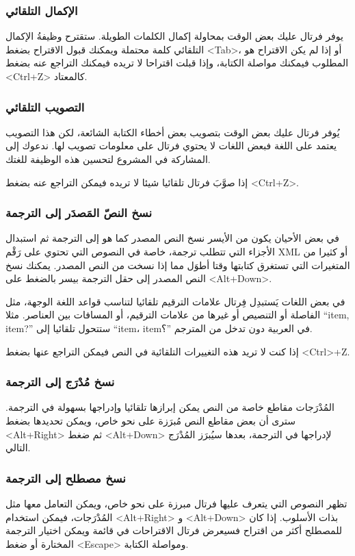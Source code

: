 \subsubsection{الإكمال التلقائي}
يوفر فرتال عليك بعض الوقت بمحاولة إكمال الكلمات الطويلة. ستقترح وظيفةُ
الإكمال التلقائي كلمة محتملة ويمكنك قبول الاقتراح بضغط <Tab>، أو إذا لم
يكن الاقتراح هو المطلوب فيمكنك مواصلة الكتابة، وإذا قبلت اقتراحا لا
تريده فيمكنك التراجع عنه بضغط <Ctrl+Z> كالمعتاد.

\subsubsection{التصويب التلقائي}
يُوفر فرتال عليك بعض الوقت بتصويب بعض أخطاء الكتابة الشائعة، لكن هذا
التصويب يعتمد على اللغة فبعض اللغات لا يحتوي فرتال على معلومات تصويب
لها. ندعوك إلى المشاركة في المشروع لتحسين هذه الوظيفة للغتك.

إذا صوَّبَ فرتال تلقائيا شيئا لا تريده فيمكن التراجع عنه بضغط <Ctrl+Z>.

\subsubsection[ref:36503815]{نسخ النصّ المَصدَر إلى الترجمة}
في بعض الأحيان يكون من الأيسر نسخ
النص المصدر كما هو إلى الترجمة ثم استبدال الأجزاء التي تتطلب ترجمة،
خاصة في النصوص التي تحتوي على رَقْم XML أو كثيرا من المتغيرات التي
تستغرق كتابتها وقتا أطوَل مما إذا نسخت من النص المصدر. يمكنك نسخ النص
المصدر إلى حقل الترجمة بيسر بالضغط على <Alt+Down>.

في بعض اللغات يَستبدِل فِرتال علامات الترقيم تلقائيا لتناسب قواعد اللغة
الوجهة، مثل الفاصلة أو التنصيص أو غيرها من علامات الترقيم، أو المسافات
بين العناصر. مثلا ‪“item, item?”‬ ستتحول تلقائيا إلى ‪“item، item؟”‬ في
العربية دون تدخل من المترجم.

إذا كنت لا تريد هذه التغييرات التلقائية في النص فيمكن التراجع عنها بضغط
<Ctrl>+Z.

\subsubsection[ref:32596109]{نسخ مُدْرَج إلى الترجمة}
المُدْرَجات مقاطع خاصة من النص
يمكن إبرازها تلقائيا وإدراجها بسهولة في الترجمة. سترى أن بعض مقاطع النص
مُبرَزة على نحو خاص، ويمكن تحديدها بضغط <Alt+Right> ثم ضغط <Alt+Down>
لإدراجها في الترجمة، بعدها سيُبرَز المُدْرَج التالي.

\subsubsection{نسخ مصطلح إلى الترجمة}
تظهر النصوص التي يتعرف عليها فرتال مبرزة على نحو خاص، ويمكن التعامل معها
مثل المُدْرَجات، فيمكن استخدام <Alt+Right> و <Alt+Down> بذات الأسلوب.
إذا كان للمصطلح أكثر من اقتراح فسيعرض فرتال الاقتراحات في قائمة ويمكن
اختيار الترجمة المختارة أو ضغط <Escape> ومواصلة الكتابة.

